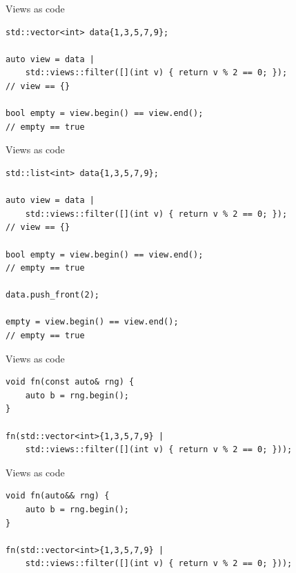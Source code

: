 \documentclass[aspectratio=169]{beamer}
\begin{document}
\begin{frame}[fragile,c]{Views as code}
\begin{center}
\begin{verbatim}
std::vector<int> data{1,3,5,7,9};

auto view = data | 
    std::views::filter([](int v) { return v % 2 == 0; });
// view == {}

bool empty = view.begin() == view.end();
// empty == true
\end{verbatim}
\end{center}
\let\thefootnote\relax{}
\end{frame}

\begin{frame}[fragile,c]{Views as code}
\begin{center}
\begin{verbatim}
std::list<int> data{1,3,5,7,9};

auto view = data | 
    std::views::filter([](int v) { return v % 2 == 0; });
// view == {}

bool empty = view.begin() == view.end();
// empty == true

data.push_front(2);

empty = view.begin() == view.end();
// empty == true
\end{verbatim}
\end{center}
\let\thefootnote\relax{}
\end{frame}

\begin{frame}[fragile,c]{Views as code}
\begin{center}
\begin{verbatim}
void fn(const auto& rng) {
    auto b = rng.begin();
}

fn(std::vector<int>{1,3,5,7,9} |
    std::views::filter([](int v) { return v % 2 == 0; }));
\end{verbatim}
\end{center}
\let\thefootnote\relax{}
\end{frame}

\begin{frame}[fragile,c]{Views as code}
\begin{center}
\begin{verbatim}
void fn(auto&& rng) {
    auto b = rng.begin();
}

fn(std::vector<int>{1,3,5,7,9} |
    std::views::filter([](int v) { return v % 2 == 0; }));
\end{verbatim}
\end{center}
\let\thefootnote\relax{}
\end{frame}
\end{document}
